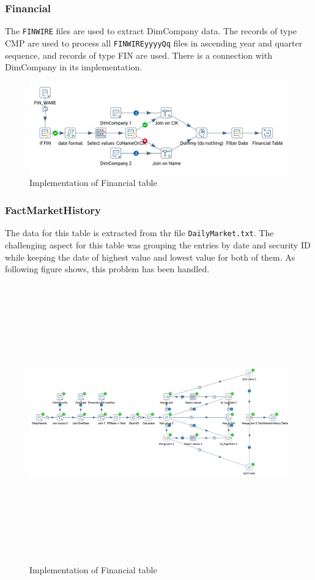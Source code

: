 \documentclass{article}
\newcommand\pcw[1]{\texttt{#1}}
\begin{document}
\subsubsection{Financial}
The \pcw{FINWIRE} files are used to extract DimCompany data. The records of type CMP are used to process all \pcw{FINWIREyyyyQq} files in ascending year and quarter sequence, and records of type FIN are used. There is a connection with DimCompany in its implementation.
\begin{figure}[H] 
\begin{center}
\includegraphics[width=15cm, height=4cm]{images2/FinancIMP.png}
\end{center}
\caption{Implementation of Financial table}
\label{Financ}
\end{figure} 

\subsubsection{FactMarketHistory}
The data for this table is extracted from thr file \pcw{DailyMarket.txt}. The challenging aspect for this table was grouping the entries by date and security ID while keeping the date of highest value and lowest value for both of them. As following figure shows, this problem has been handled.
\begin{figure}[H] 
\begin{center}
\includegraphics[width=15cm, height=12cm]{images2/FMHIMP.png}
\end{center}
\caption{Implementation of Financial table}
\label{FMHimp}
\end{figure} 
\end{document}
